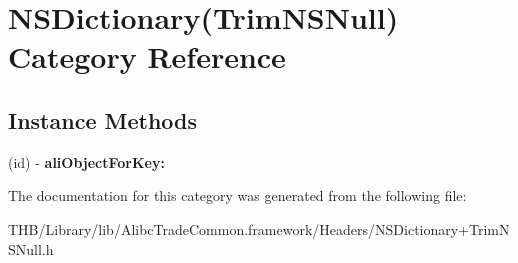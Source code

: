 \hypertarget{category_n_s_dictionary_07_trim_n_s_null_08}{}\section{N\+S\+Dictionary(Trim\+N\+S\+Null) Category Reference}
\label{category_n_s_dictionary_07_trim_n_s_null_08}
\subsection*{Instance Methods}
\begin{DoxyCompactItemize}
\item 
\mbox{\label{category_n_s_dictionary_07_trim_n_s_null_08_a1ef5e3cab7b2341516dfdbe0417d6d51}} 
(id) -\/ {\bfseries ali\+Object\+For\+Key\+:}
\end{DoxyCompactItemize}


The documentation for this category was generated from the following file\+:\begin{DoxyCompactItemize}
\item 
T\+H\+B/\+Library/lib/\+Alibc\+Trade\+Common.\+framework/\+Headers/N\+S\+Dictionary+\+Trim\+N\+S\+Null.\+h\end{DoxyCompactItemize}
